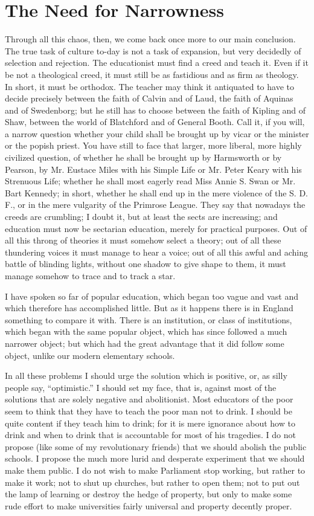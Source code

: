 \documentclass{book}
\begin{document}
\chapter{The Need for Narrowness}
\label{chapter-40}
Through all this chaos, then, we come back once more to our main conclusion. The true task of culture to-day is not a task of expansion, but very decidedly of selection and rejection. The educationist must find a creed and teach it. Even if it be not a theological creed, it must still be as fastidious and as firm as theology. In short, it must be orthodox. The teacher may think it antiquated to have to decide precisely between the faith of Calvin and of Laud, the faith of Aquinas and of Swedenborg; but he still has to choose between the faith of Kipling and of Shaw, between the world of Blatchford and of General Booth. Call it, if you will, a narrow question whether your child shall be brought up by vicar or the minister or the popish priest. You have still to face that larger, more liberal, more highly civilized question, of whether he shall be brought up by Harmsworth or by Pearson, by Mr. Eustace Miles with his Simple Life or Mr. Peter Keary with his Strenuous Life; whether he shall most eagerly read Miss Annie S. Swan or Mr. Bart Kennedy; in short, whether he shall end up in the mere violence of the S. D. F., or in the mere vulgarity of the Primrose League. They say that nowadays the creeds are crumbling; I doubt it, but at least the sects are increasing; and education must now be sectarian education, merely for practical purposes. Out of all this throng of theories it must somehow select a theory; out of all these thundering voices it must manage to hear a voice; out of all this awful and aching battle of blinding lights, without one shadow to give shape to them, it must manage somehow to trace and to track a star.

I have spoken so far of popular education, which began too vague and vast and which therefore has accomplished little. But as it happens there is in England something to compare it with. There is an institution, or class of institutions, which began with the same popular object, which has since followed a much narrower object; but which had the great advantage that it did follow some object, unlike our modern elementary schools.

In all these problems I should urge the solution which is positive, or, as silly people say, “optimistic.” I should set my face, that is, against most of the solutions that are solely negative and abolitionist. Most educators of the poor seem to think that they have to teach the poor man not to drink. I should be quite content if they teach him to drink; for it is mere ignorance about how to drink and when to drink that is accountable for most of his tragedies. I do not propose (like some of my revolutionary friends) that we should abolish the public schools. I propose the much more lurid and desperate experiment that we should make them public. I do not wish to make Parliament stop working, but rather to make it work; not to shut up churches, but rather to open them; not to put out the lamp of learning or destroy the hedge of property, but only to make some rude effort to make universities fairly universal and property decently proper.
\end{document}
